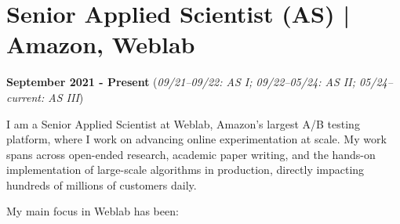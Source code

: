 \section*{Senior Applied Scientist (AS) | Amazon, Weblab}
\textbf{September 2021 - Present} (\emph{09/21--09/22: AS I; 09/22--05/24: AS II; 05/24--current: AS III})

I am a Senior Applied Scientist at Weblab, Amazon’s largest A/B testing platform, where I work on advancing online experimentation at scale. My work spans across open-ended research, academic paper writing, and the hands-on implementation of large-scale algorithms in production, directly impacting hundreds of millions of customers daily. 

\par My main focus in Weblab has been:

